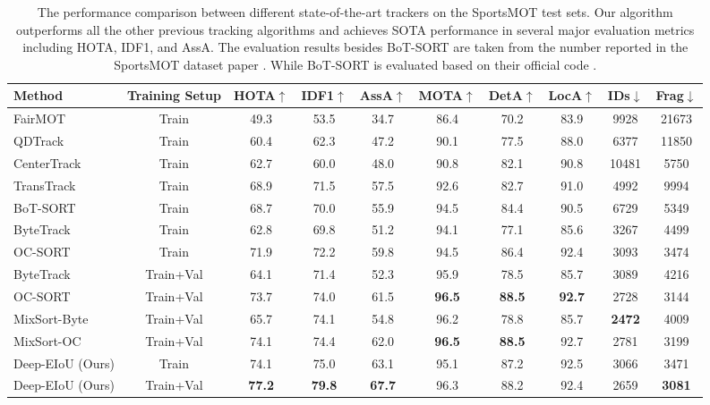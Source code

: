 \documentclass[10pt,twocolumn,letterpaper]{article}
\begin{document}
\begin{table*}[t]
  \begin{center}
    {\small{
\begin{tabular}{lccccccccc}
\toprule

 Method & Training Setup & HOTA$\uparrow$ & IDF1$\uparrow$ & AssA$\uparrow$ & MOTA$\uparrow$ & DetA$\uparrow$ & LocA$\uparrow$ & IDs$\downarrow$ & Frag$\downarrow$ \\
 
\midrule

FairMOT \cite{FairMOT} & Train & 49.3 & 53.5 & 34.7 & 86.4 & 70.2 & 83.9 & 9928 & 21673 \\
QDTrack \cite{fischer2022qdtrack} & Train & 60.4 & 62.3 & 47.2 & 90.1 & 77.5 & 88.0 & 6377 & 11850 \\
CenterTrack \cite{Zhou2020TrackingOA} & Train & 62.7 & 60.0 & 48.0 & 90.8 & 82.1 & 90.8 & 10481 & 5750 \\
TransTrack \cite{sun2020transtrack} & Train & 68.9 & 71.5 & 57.5 & 92.6 & 82.7 & 91.0 & 4992 & 9994 \\
BoT-SORT \cite{aharon2022bot} & Train & 68.7 & 70.0 & 55.9 & 94.5 & 84.4 & 90.5 & 6729 & 5349 \\
ByteTrack \cite{ByteTrack} & Train & 62.8 & 69.8 & 51.2 & 94.1 & 77.1 & 85.6 & 3267 & 4499 \\
OC-SORT \cite{OCSORT} & Train & 71.9 & 72.2 & 59.8 & 94.5 & 86.4 & 92.4 & 3093 & 3474 \\
ByteTrack \cite{ByteTrack} & Train+Val & 64.1 & 71.4 & 52.3 & 95.9 & 78.5 & 85.7 & 3089 & 4216 \\
OC-SORT \cite{OCSORT} & Train+Val & 73.7 & 74.0 & 61.5 & \textbf{96.5} & \textbf{88.5} & \textbf{92.7} & 2728 & 3144\\
MixSort-Byte \cite{cui2023sportsmot} & Train+Val & 65.7 & 74.1 & 54.8 & 96.2 & 78.8 & 85.7 & \textbf{2472} & 4009 \\
MixSort-OC \cite{cui2023sportsmot} & Train+Val & 74.1 & 74.4 & 62.0 & \textbf{96.5} & \textbf{88.5} & 92.7 & 2781 & 3199\\
\midrule
\rowcolor{aliceblue}
Deep-EIoU (Ours) & Train & 74.1 & 75.0 & 63.1 & 95.1 & 87.2 & 92.5 & 3066 & 3471 \\
\rowcolor{aliceblue}
Deep-EIoU (Ours) & Train+Val & \textbf{77.2} & \textbf{79.8} & \textbf{67.7} & 96.3 & 88.2 & 92.4 & 2659 & \textbf{3081} \\

\bottomrule
\end{tabular}
}}
\end{center}
\caption{The performance comparison between different state-of-the-art trackers on the SportsMOT test sets. Our algorithm outperforms all the other previous tracking algorithms and achieves SOTA performance in several major evaluation metrics including HOTA, IDF1, and AssA. The evaluation results besides BoT-SORT are taken from the number reported in the SportsMOT dataset paper \cite{cui2023sportsmot}. While BoT-SORT is evaluated based on their official code \cite{aharon2022bot}.
} 
\label{table:sportsmot}
\end{table*}
\end{document}
